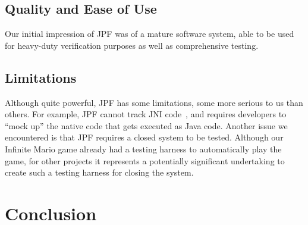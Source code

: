 \documentclass[twocolumn]{article}
\begin{document}
\subsection{Quality and Ease of Use}
Our initial impression of JPF was of a mature software system, able to be used for heavy-duty verification purposes as well as comprehensive testing. 


\subsection{Limitations}
Although quite powerful, JPF has some limitations, some more serious to us than others. 
For example, JPF cannot track JNI code~\cite{jni}, and requires developers to ``mock up'' the native code that gets executed as Java code. 
Another issue we encountered is that JPF requires a closed system to be tested. 
Although our Infinite Mario game already had a testing harness to automatically play the game, for other projects it represents a potentially significant undertaking to create such a testing harness for closing the system. 

\section{Conclusion}





\end{document}
